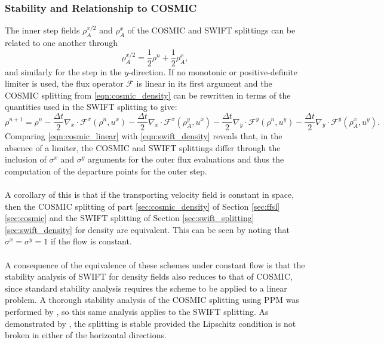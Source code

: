 \documentclass{ametsocV6.1}
\begin{document}
\subsubsection{Stability and Relationship to COSMIC}
The inner step fields $\rho_A^{x/2}$ and $\rho_A^{x}$ of the COSMIC and SWIFT splittings can be related to one another through
\begin{equation}
\rho_A^{x/2} = \frac{1}{2}\rho^n + \frac{1}{2}\rho_A^x,
\end{equation}
and similarly for the step in the $y$-direction.
If no monotonic or positive-definite limiter is used, the flux operator $\mathcal{F}$ is linear in its first argument and the COSMIC splitting from \eqref{eqn:cosmic_density} can be rewritten in terms of the quantities used in the SWIFT splitting to give:
\begin{equation} \label{eqn:cosmic_linear}
\rho^{n+1} = \rho^n - \frac{\Delta t}{2} \nabla_x\cdot \mathcal{F}^x(\rho^n, u^x) - \frac{\Delta{t}}{2} \nabla_x\cdot \mathcal{F}^x(\rho^y_A, u^x)
- \frac{\Delta{t}}{2} \nabla_y\cdot \mathcal{F}^y(\rho^n, u^y) - \frac{\Delta{t}}{2} \nabla_y\cdot \mathcal{F}^y(\rho^x_A, u^y).
\end{equation}
Comparing \eqref{eqn:cosmic_linear} with \eqref{eqn:swift_density} reveals that, in the absence of a limiter, the COSMIC and SWIFT splittings differ through the inclusion of $\sigma^x$ and $\sigma^y$ arguments for the outer flux evaluations and thus the computation of the departure points for the outer step.
\\
\\
A corollary of this is that if the transporting velocity field is constant in space, then the COSMIC splitting of part \ref{sec:cosmic_density} of Section \ref{sec:ffsl}\ref{sec:cosmic} and the SWIFT splitting of Section \ref{sec:swift_splitting}\ref{sec:swift_density} for density are equivalent.
This can be seen by noting that $\sigma^x=\sigma^y=1$ if the flow is constant. \\
\\
A consequence of the equivalence of these schemes under constant flow is that the stability analysis of SWIFT for density fields also reduces to that of COSMIC, since standard stability analysis requires the scheme to be applied to a linear problem.
A thorough stability analysis of the COSMIC splitting using PPM was performed by \citet{lauritzen2007fvstab}, so this same analysis applies to the SWIFT splitting.
As demonstrated by \citet{lin1996ffsl}, the splitting is stable provided the Lipschitz condition is not broken in either of the horizontal directions. \\
\end{document}
